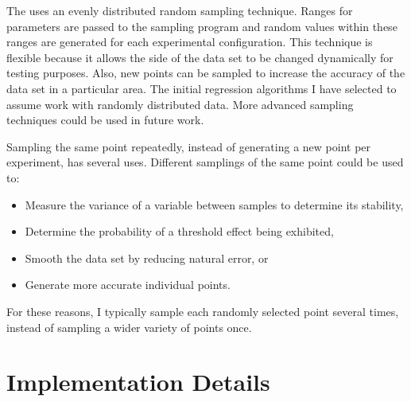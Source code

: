 The \fw uses an evenly distributed random sampling technique.
Ranges for parameters are passed to the sampling program and random values within these ranges are generated for each experimental configuration.
This technique is flexible because it allows the side of the data set to be changed dynamically for testing purposes.
Also, new points can be sampled to increase the accuracy of the data set in a particular area.
The initial regression algorithms I have selected to assume \fw  work with randomly distributed data.
More advanced sampling techniques could be used in future work.

Sampling the same point repeatedly, instead of generating a new point per experiment, has several uses.
Different samplings of the same point could be used to:
\begin{itemize}
   \item Measure the variance of a variable between samples to determine its stability,
   \item Determine the probability of a threshold effect being exhibited,
   \item Smooth the data set by reducing natural error, or
   \item Generate more accurate individual points.
\end{itemize}
For these reasons, I typically sample each randomly selected point several times, instead of sampling a wider variety of points once.

\section{Implementation Details}

